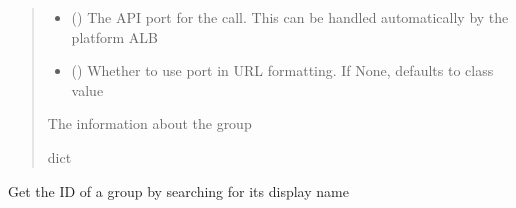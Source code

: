 \documentclass[letterpaper,10pt,english]{sphinxmanual}
\begin{document}
\begin{fulllineitems}
\begin{fulllineitems}
\begin{quote}
\begin{description}
\begin{itemize}
\item {} 
\sphinxAtStartPar
{} (\sphinxstyleliteralemphasis{\sphinxupquote{ (}}\sphinxstyleliteralemphasis{\sphinxupquote{)}}) \textendash{} The API port for the call. This can be handled automatically by the platform ALB

\item {} 
\sphinxAtStartPar
{} (\sphinxstyleliteralemphasis{\sphinxupquote{ (}}\sphinxstyleliteralemphasis{\sphinxupquote{)}}) \textendash{} Whether to use port in URL formatting. If None, defaults to class value

\end{itemize}

\sphinxAtStartPar
{} \textendash{} The information about the group

\sphinxAtStartPar
dict

\end{description}\end{quote}

\end{fulllineitems}


\begin{fulllineitems}
\label{\detokenize{aisquared.platform:aisquared.platform.AISquaredPlatformClient.AISquaredPlatformClient.get_group_id_by_name}}
\pysigstartsignatures
{}
\pysigstopsignatures
\sphinxAtStartPar
Get the ID of a group by searching for its display name


\end{fulllineitems}
\end{fulllineitems}
\end{document}

